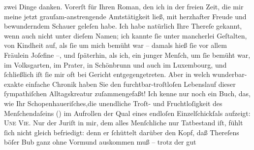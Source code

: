\begin{ledgroupsized}[t]{13cm}
               zwei Dinge danken.\pend
           \pstart
           Vorerſt für Ihren Roman, den
               ich in der freien Zeit, die mir meine jetzt grauſam-anstrengende Amtstätigkeit ließ,
               mit herzhafter Freude und bewunderndem Schauer geleſen habe. {\pb}Ich habe natürlich Ihre Thereſe gekannt,
               wenn auch nicht unter dieſem Namen; ich kannte ſie unter mancherlei Geſtalten, von
               Kindheit auf, als ſie um mich bemüht war – damals hieß ſie vor allem Fräulein
               Joſefine –, und ſpäterhin, als ich, ein junger Menſch, um ſie bemüht war, im Volksgarten, im Prater, in Schönbrunn und auch im Luxembourg, und ſchließlich iſt ſie mir oft bei
               Gericht entgegengetreten. Aber in welch wunderbar-exakte einfache Chronik haben Sie
               den furchtbar-troſtloſen Lebenslauf dieser ſympathiſchen Alltagskreatur
               zuſammengefaßt! Ich kenne nur noch ein Buch, das, wie Ihr Schopenhaueriſches,die unendliche Troſt- und Fruchtloſigkeit
               des Menſchendaſeins (\textsc{\label{K_L02500_1v}\label{K_L02500_1h}}) im Aufrollen der Qual eines endloſen Einzelſchickſals aufzeigt: \textsc{Une Vie}.\pend
           \pstart
           {\pb}Nur der Juriſt in mir, dem alles
               Menſchliche nur Tatbestand iſt, fühlt ſich nicht gleich befriedigt: denn er ſchüttelt
               darüber den Kopf, daß Thereſens böſer Bub ganz ohne Vormund auskommen muß – trotz der gut

\end{ledgroupsized}
